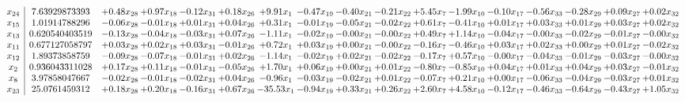 \documentclass[9pt]{article}
\begin{document}
 \[\begin{array}{c| c c@{\hskip 2pt} c@{\hskip 2pt} c@{\hskip 2pt} c@{\hskip 2pt} c@{\hskip 2pt} c@{\hskip 2pt} c@{\hskip 2pt} c@{\hskip 2pt} c@{\hskip 2pt} c@{\hskip 2pt} c@{\hskip 2pt} c@{\hskip 2pt} c@{\hskip 2pt} c@{\hskip 2pt} c@{\hskip 2pt} }
 x_{24}   &  7.63929873393 & +  0.48 x_{28} & +  0.97 x_{18} & -0.12 x_{31} & +  0.18 x_{26} & +  9.91 x_{1} & -0.47 x_{19} & -0.40 x_{21} & -0.21 x_{22} & +  5.45 x_{7} & -1.99 x_{10} & -0.10 x_{17} & -0.56 x_{33} & -0.28 x_{29} & +  0.09 x_{27} & +  0.02 x_{32}\\
 x_{15}   &  1.01914788296 & -0.06 x_{28} & -0.01 x_{18} & +  0.01 x_{31} & +  0.04 x_{26} & +  0.31 x_{1} & -0.01 x_{19} & -0.05 x_{21} & -0.02 x_{22} & +  0.61 x_{7} & -0.41 x_{10} & +  0.01 x_{17} & +  0.03 x_{33} & +  0.01 x_{29} & +  0.03 x_{27} & +  0.02 x_{32}\\
 x_{13}   &  0.620540403519 & -0.13 x_{28} & -0.04 x_{18} & -0.03 x_{31} & +  0.07 x_{26} & -1.11 x_{1} & -0.02 x_{19} & -0.00 x_{21} & -0.00 x_{22} & +  0.49 x_{7} & +  1.14 x_{10} & -0.04 x_{17} & -0.00 x_{33} & -0.02 x_{29} & -0.01 x_{27} & -0.00 x_{32}\\
 x_{11}   &  0.677127058797 & +  0.03 x_{28} & +  0.02 x_{18} & +  0.03 x_{31} & -0.01 x_{26} & +  0.72 x_{1} & +  0.03 x_{19} & +  0.00 x_{21} & -0.00 x_{22} & -0.16 x_{7} & -0.46 x_{10} & +  0.03 x_{17} & +  0.02 x_{33} & +  0.00 x_{29} & +  0.01 x_{27} & -0.02 x_{32}\\
 x_{12}   &  1.89373858759 & -0.09 x_{28} & -0.07 x_{18} & -0.01 x_{31} & +  0.02 x_{26} & -1.14 x_{1} & -0.02 x_{19} & +  0.02 x_{21} & -0.02 x_{22} & -0.17 x_{7} & +  0.57 x_{10} & -0.00 x_{17} & -0.04 x_{33} & -0.01 x_{29} & -0.03 x_{27} & -0.00 x_{32}\\
 x_{2}   &  0.936043311028 & +  0.17 x_{28} & +  0.11 x_{18} & -0.01 x_{31} & -0.05 x_{26} & +  1.70 x_{1} & +  0.06 x_{19} & +  0.00 x_{21} & +  0.01 x_{22} & -0.80 x_{7} & -0.85 x_{10} & +  0.04 x_{17} & +  0.01 x_{33} & +  0.04 x_{29} & +  0.03 x_{27} & -0.01 x_{32}\\
 x_{8}   &  3.97858047667 & -0.02 x_{28} & -0.01 x_{18} & -0.02 x_{31} & +  0.04 x_{26} & -0.96 x_{1} & -0.03 x_{19} & -0.02 x_{21} & +  0.01 x_{22} & -0.07 x_{7} & +  0.21 x_{10} & +  0.00 x_{17} & -0.06 x_{33} & -0.04 x_{29} & -0.03 x_{27} & +  0.01 x_{32}\\
 x_{23}   &  25.0761459312 & +  0.18 x_{28} & +  0.20 x_{18} & -0.16 x_{31} & +  0.67 x_{26} & -35.53 x_{1} & -0.94 x_{19} & +  0.33 x_{21} & +  0.26 x_{22} & +  2.60 x_{7} & +  4.58 x_{10} & -0.12 x_{17} & -0.46 x_{33} & -0.64 x_{29} & -0.43 x_{27} & +  1.05 x_{32}\\

\end{array}\]
\end{document}
